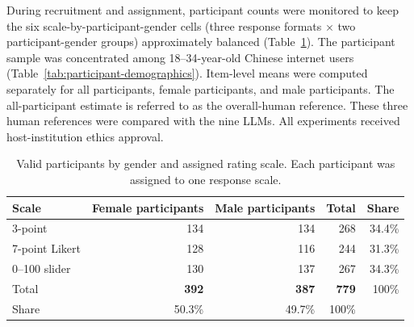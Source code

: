 \documentclass[a4paper,fleqn,review]{cas-sc}
\begin{document}
During recruitment and assignment, participant counts were monitored to keep the six scale-by-participant-gender cells (three response formats $\times$ two participant-gender groups) approximately balanced (Table~\ref{tab:session-balance}). The participant sample was concentrated among 18--34-year-old Chinese internet users (Table~\ref{tab:participant-demographics}). Item-level means were computed separately for all participants, female participants, and male participants. The all-participant estimate is referred to as the overall-human reference. These three human references were compared with the nine LLMs. All experiments received host-institution ethics approval.

\begin{table}[t]
  \centering
  \small
  \begin{tabular}{lrrr|r}
    \toprule
    Scale & Female participants & Male participants & Total & Share \\
    \midrule
    3-point & 134 & 134 & 268 & 34.4\% \\
    7-point Likert & 128 & 116 & 244 & 31.3\% \\
    0--100 slider & 130 & 137 & 267 & 34.3\% \\
    \midrule
    Total & \textbf{392} & \textbf{387} & \textbf{779} & 100\% \\
    Share & 50.3\% & 49.7\% & 100\% & \\
    \bottomrule
  \end{tabular}
  \caption{Valid participants by gender and assigned rating scale. Each participant was assigned to one response scale.}
  \label{tab:session-balance}
\end{table}
\end{document}
